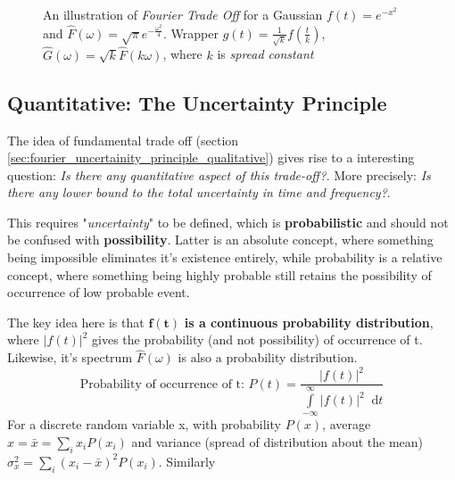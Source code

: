 \documentclass[11pt, a4paper]{article}
\newcommand{\variance}[1]{\sigma_{#1}^{2}}
\newcommand{\diff}{\mathop{}\!\mathrm{d}}
\newcommand{\dt}{\diff t}
\newcommand{\dint}[2]{\int \limits_{#1}^{#2}}  %
\newcommand{\intinfty}{\dint{-\infty}{\infty}}	%
\begin{document}
\begin{figure}[H]
{
	}
	
	
	\caption{An illustration of \textit{Fourier Trade Off} for a Gaussian $f(t) = e^{-x^2}$ and $\hat{F}(\omega) = \sqrt{\pi} e^{-\frac{\omega^2}{4}}$. Wrapper $g(t)=\frac{1}{\sqrt{k}} f \left( \frac{t}{k} \right)$, $\hat{G}(\omega) = \sqrt{k} \hat{F}(k \omega)$, where $k$ is \textit{spread constant}}
	
	\label{fig:fourier_tradeoff}  %
\end{figure}

\subsection{Quantitative: The Uncertainty Principle}
The idea of fundamental trade off (section \ref{sec:fourier_uncertainity_principle_qualitative}) gives rise to a interesting question: \textit{Is there any quantitative aspect of this trade-off?}. More precisely: \textit{Is there any lower bound to the total uncertainty in time and frequency?}.

This requires "\textit{uncertainty}" to be defined, which is \textbf{probabilistic} and should not be confused with \textbf{possibility}. Latter is an absolute concept, where something being impossible eliminates it's existence entirely, while probability is a relative concept, where something being highly probable still retains the possibility of occurrence of low probable event.

The key idea here is that $\boldsymbol{f(t)}$ \textbf{is a continuous probability distribution}, where $|f(t)|^{2}$ gives the probability (and not possibility) of occurrence of t. Likewise, it's spectrum $\hat{F}(\omega)$ is also a probability distribution.
\begin{equation*}
	\text{Probability of occurrence of t: }P(t) = \frac{|f(t)|^{2}}{\intinfty |f(t)|^{2} \dt}
\end{equation*}
For a discrete random variable x, with probability $P(x)$, average $x = \bar{x} = \sum \limits_{i} x_{i} P(x_{i})$ and variance (spread of distribution about the mean) $ \variance{x} = \sum \limits_{i} (x_{i} - \bar{x})^{2} P(x_{i})$. Similarly
\end{document}
